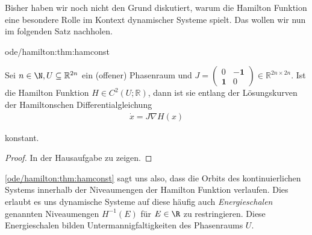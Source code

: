 \documentclass[letterpaper,10pt,german]{jupyterBook}
\begin{document}
\par
Bisher haben wir noch nicht den Grund diskutiert, warum die Hamilton Funktion eine besondere Rolle im Kontext dynamischer Systeme spielt.
Das wollen wir nun im folgenden Satz nachholen.
\begin{theorem}{}{ode/hamilton:thm:hamconst}



\par
Sei \(n\in \N, U \subseteq \mathbb{R}^{2n}\) ein (offener) Phasenraum und \(J= \begin{pmatrix} 0 & - \mathbf{1} \\ \mathbf{1} & 0 \end{pmatrix} \in \mathbb{R}^{2n \times 2n}\).
Ist die Hamilton Funktion \(H \in C^2(U; \mathbb{R})\), dann ist sie entlang der Lösungskurven der Hamiltonschen Differentialgleichung
\begin{align*}
\dot x = J \nabla H(x)
\end{align*}
\par
konstant.
\end{theorem}

\begin{proof}
 In der Hausaufgabe zu zeigen.
\end{proof}

\par
\cref{ode/hamilton:thm:hamconst} sagt uns also, dass die Orbits des kontinuierlichen Systems innerhalb der Niveaumengen der Hamilton Funktion verlaufen.
Dies erlaubt es uns dynamische Systeme auf diese häufig auch \emph{Energieschalen} genannten Niveaumengen \(H^{-1}(E)\) für \(E \in \R\) zu restringieren.
Diese Energieschalen bilden Untermannigfaltigkeiten des Phasenraums \(U\).
\end{document}
